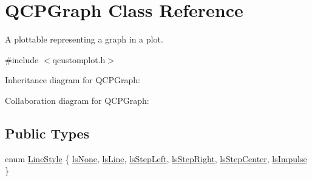 \hypertarget{class_q_c_p_graph}{}\section{Q\+C\+P\+Graph Class Reference}
\label{class_q_c_p_graph}


A plottable representing a graph in a plot.  




{\ttfamily \#include $<$qcustomplot.\+h$>$}



Inheritance diagram for Q\+C\+P\+Graph\+:


Collaboration diagram for Q\+C\+P\+Graph\+:
\subsection*{Public Types}
\begin{DoxyCompactItemize}
\item 
enum \hyperlink{class_q_c_p_graph_ad60175cd9b5cac937c5ee685c32c0859}{Line\+Style} \{ \newline
\hyperlink{class_q_c_p_graph_ad60175cd9b5cac937c5ee685c32c0859aea9591b933733cc7b20786b71e60fa04}{ls\+None}, 
\hyperlink{class_q_c_p_graph_ad60175cd9b5cac937c5ee685c32c0859a3c42a27b15aa3c92d399082fad8b7515}{ls\+Line}, 
\hyperlink{class_q_c_p_graph_ad60175cd9b5cac937c5ee685c32c0859ae10568bda57836487d9dec5eba1d6c6e}{ls\+Step\+Left}, 
\hyperlink{class_q_c_p_graph_ad60175cd9b5cac937c5ee685c32c0859a9c37951f7d11aa070100fd16f2935c9e}{ls\+Step\+Right}, 
\newline
\hyperlink{class_q_c_p_graph_ad60175cd9b5cac937c5ee685c32c0859a5adf7b04da215a40a764c21294ea7366}{ls\+Step\+Center}, 
\hyperlink{class_q_c_p_graph_ad60175cd9b5cac937c5ee685c32c0859aa3b358b4ae7cca94aceeb8e529c12ebb}{ls\+Impulse}
 \}
\end{DoxyCompactItemize}
